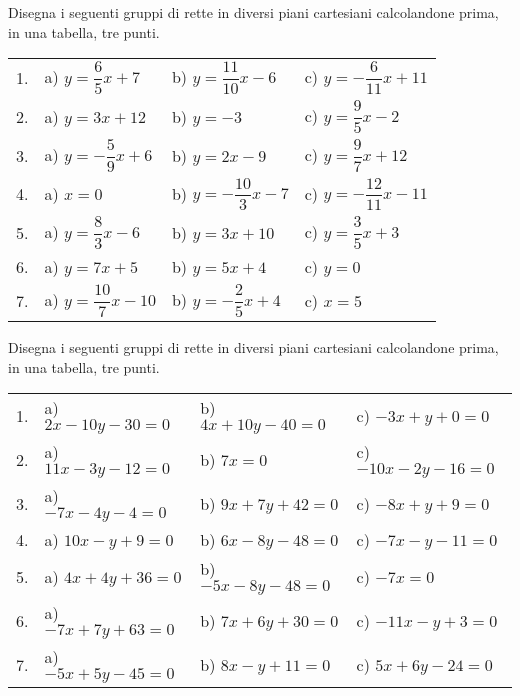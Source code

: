 \begin{esercizio}\label{ese:}
Disegna i seguenti gruppi di rette in diversi piani cartesiani 
calcolandone prima, in una tabella, tre punti.

\begin{tabular}{llll}
1. &
a) \quad $y = \dfrac{6}{5} x +7$ & 
b) \quad $y = \dfrac{11}{10} x -6$ & 
c) \quad $y = -\dfrac{6}{11} x +11$ \\
2. &
a) \quad $y = 3 x +12$ &   
b) \quad $y = -3$ &
c) \quad $y = \dfrac{9}{5} x -2$ \\
3. &
a) \quad $y = -\dfrac{5}{9} x +6$ &   
b) \quad $y = 2 x -9$ &
c) \quad $y = \dfrac{9}{7} x +12$ \\
4. &
a) \quad $x = 0$ &   
b) \quad $y = -\dfrac{10}{3} x -7$ &
c) \quad $y = -\dfrac{12}{11} x -11$ \\
5. &
a) \quad $y = \dfrac{8}{3} x -6$ &   
b) \quad $y = 3 x +10$ &
c) \quad $y = \dfrac{3}{5} x +3$ \\
6. &
a) \quad $y = 7 x +5$ &   
b) \quad $y = 5 x +4$ &
c) \quad $y = 0$ \\
7. &
a) \quad $y = \dfrac{10}{7} x -10$ &   
b) \quad $y = -\dfrac{2}{5} x +4$ &
c) \quad $x = 5$ \\
\end{tabular}
\end{esercizio}

\vspace{-6pt}
\begin{esercizio}\label{ese:}
Disegna i seguenti gruppi di rette in diversi piani cartesiani 
calcolandone prima, in una tabella, tre punti.

\begin{tabular}{llll}
1. &
a) \quad $2 x - 10 y - 30 = 0$ & 
b) \quad $4 x + 10 y - 40 = 0$ & 
c) \quad $-3 x + y + 0 = 0$ \\
2. &
a) \quad $11 x - 3 y - 12 = 0$ &   
b) \quad $7 x = 0$ &
c) \quad $-10 x - 2 y - 16 = 0$ \\
3. &
a) \quad $-7 x - 4 y - 4 = 0$ &   
b) \quad $9 x + 7 y + 42 = 0$ &
c) \quad $-8 x + y + 9 = 0$ \\
4. &
a) \quad $10 x - y + 9 = 0$ &   
b) \quad $6 x - 8 y - 48 = 0$ &
c) \quad $-7 x - y - 11 = 0$ \\
5. &
a) \quad $4 x + 4 y + 36 = 0$ &   
b) \quad $-5 x - 8 y - 48 = 0$ &
c) \quad $-7 x = 0$ \\
6. &
a) \quad $-7 x + 7 y + 63 = 0$ &   
b) \quad $7 x + 6 y + 30 = 0$ &
c) \quad $-11 x - y + 3 = 0$ \\
7. &
a) \quad $-5 x + 5 y - 45 = 0$ &   
b) \quad $8 x - y + 11 = 0$ &
c) \quad $5 x + 6 y - 24 = 0$ \\
\end{tabular}
\end{esercizio}


